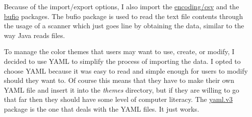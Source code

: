 Because of the import/export options, I also import the
\href{https://pkg.go.dev/encoding/csv}{encoding/csv} and the
\href{https://pkg.go.dev/bufio}{bufio} packages.
The bufio package is used to read the text file contents through the
usage of a scanner which just goes line by obtaining the data,
similar to the way Java reads files.

To manage the color themes that users may want to use, create, or
modify, I decided to use YAML to simplify the process of importing the data.
I opted to choose YAML because it was easy to read and simple enough
for users to modify should they want to. Of course this means that
they have to make their own YAML file and insert it into the
\textit{themes} directory, but if they are willing to go that far
then they should have some level of computer literacy.
The \href{https://pkg.go.dev/gopkg.in/yaml.v3}{yaml.v3} package is
the one that deals with the YAML files. It just works.
